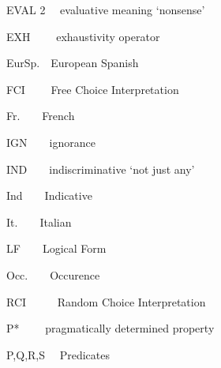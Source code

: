\begin{styleStandard}
EVAL 2 \ \ evaluative meaning ‘nonsense’
\end{styleStandard}

\begin{styleStandard}
EXH \ \ \ \ exhaustivity operator
\end{styleStandard}

\begin{styleStandard}
EurSp.\ \ European Spanish
\end{styleStandard}

\begin{styleStandard}
FCI \ \ \ \ Free Choice Interpretation
\end{styleStandard}

\begin{styleStandard}
Fr.\ \ \ \ French
\end{styleStandard}

\begin{styleStandard}
IGN\ \ \ \ ignorance
\end{styleStandard}

\begin{styleStandard}
IND\ \ \ \ indiscriminative ‘not just any’
\end{styleStandard}

\begin{styleStandard}
Ind\ \ \ \ Indicative
\end{styleStandard}

\begin{styleStandard}
It.\ \ \ \ Italian
\end{styleStandard}

\begin{styleStandard}
LF\ \ \ \ Logical Form
\end{styleStandard}

\begin{styleStandard}
Occ.\ \ \ \ Occurence
\end{styleStandard}

\begin{styleStandard}
RCI \ \ \ \ \ Random Choice Interpretation
\end{styleStandard}

\begin{styleStandard}
P* \ \ \ \ pragmatically determined property 
\end{styleStandard}

\begin{styleStandard}
P,Q,R,S \ \ Predicates
\end{styleStandard}

